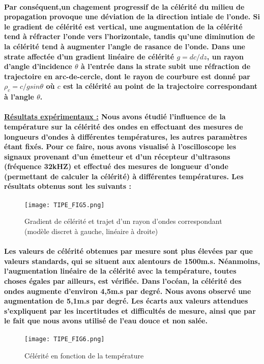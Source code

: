 \documentclass[a4paper,11pt]{article}
\begin{document}
\paragraph{\normalfont Par cons\'{e}quent,un chagement progressif de la c\'{e}l\'{e}rit\'{e} du milieu de propagation provoque une d\'{e}viation de la direction intiale de l'onde. Si le gradient de c\'{e}l\'{e}rit\'{e} est vertical, une augmentation de la c\'{e}l\'{e}rit\'{e} tend \`{a} r\'{e}fracter l'onde vers l'horizontale, tandis qu'une diminution de la c\'{e}l\'{e}rit\'{e} tend \`{a} augmenter l'angle de rasance de l'onde. Dans une strate affect\'{e}e d'un gradient lin\'{e}aire de c\'{e}l\'{e}rit\'{e} $g=dc/dz$, un rayon d'angle d'incidence $\theta$ \`{a} l'entr\'{e}e dans la strate subit une r\'{e}fraction de trajectoire en arc-de-cercle, dont le rayon de courbure est donn\'{e} par $\rho_c=c/gsin\theta$ o\`{u} $c$ est la c\'{e}l\'{e}rit\'{e} au point de la trajectoire correspondant \`{a} l'angle $\theta$.}
\paragraph{\normalfont \textbf{\underline{R\'{e}sultats exp\'{e}rimentaux :}} \newline
Nous avons \'{e}tudi\'{e} l'influence de la temp\'{e}rature sur la c\'{e}l\'{e}rit\'{e} des ondes en effectuant des mesures de longueurs d'ondes \`{a} diff\'{e}rentes temp\'{e}ratures, les autres param\`{e}tres \'{e}tant fix\'{e}s. Pour ce faire, nous avons visualis\'{e} \`{a} l'oscilloscope les signaux provenant d'un \'{e}metteur et d'un r\'{e}cepteur d'ultrasons (fr\'{e}quence 32kHZ) et effectu\'{e} des mesures de longueur d'onde (permettant de calculer la c\'{e}l\'{e}rit\'{e}) \`{a} diff\'{e}rentes temp\'{e}ratures. Les r\'{e}sultats obtenus sont les suivants :}
\begin{figure}[!h]
\texttt{[image: TIPE\_FIG5.png]}
\caption{Gradient de c\'{e}l\'{e}rit\'{e} et trajet d'un rayon d'ondes correspondant (mod\`{e}le discret \`{a} gauche, lin\'{e}aire \`{a} droite)}
\label{fig_5}
\end{figure}
\paragraph{\normalfont Les valeurs de c\'{e}l\'{e}rit\'{e} obtenues par mesure sont plus \'{e}lev\'{e}es par que valeurs standards, qui se situent aux alentours de 1500m.s. N\'{e}anmoins, l'augmentation lin\'{e}aire de la c\'{e}l\'{e}rit\'{e} avec la temp\'{e}rature, toutes choses \'{e}gales par ailleurs, est v\'{e}rifi\'{e}e. Dans l'oc\'{e}an, la c\'{e}l\'{e}rit\'{e} des ondes augmente d'environ 4,5m.s par degr\'{e}. Nous avons observ\'{e} une augmentation de 5,1m.s par degr\'{e}. Les \'{e}carts aux valeurs attendues s'expliquent par les incertitudes et difficult\'{e}s de mesure, ainsi que par le fait que nous avons utilis\'{e} de l'eau douce et non sal\'{e}e.}
\begin{figure}[!h]
\texttt{[image: TIPE\_FIG6.png]}
\caption{C\'{e}l\'{e}rit\'{e} en fonction de la temp\'{e}rature}
\label{fig_6}
\end{figure} \newpage
\end{document}
